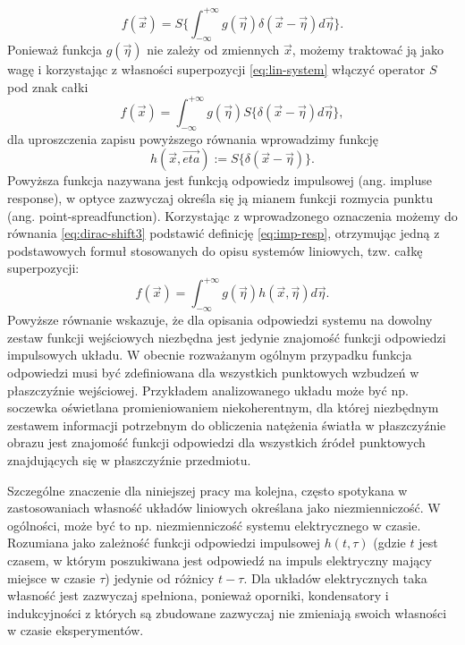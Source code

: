 \begin{equation}
f(\vec{x})=S \{\int_{-\infty}^{+\infty} g(\vec{\eta}) \delta(\vec{x}-\vec{\eta}) d \vec{\eta} \}.
\label{eq:dirac-shift2}
\end{equation}
Ponieważ funkcja $g(\vec{\eta})$ nie zależy od zmiennych $\vec{x}$, możemy traktować ją jako wagę i korzystając z własności superpozycji \ref{eq:lin-system} włączyć operator $S{}$ pod znak całki
\begin{equation}
f(\vec{x})=\int_{-\infty}^{+\infty} g(\vec{\eta})  S\{\delta(\vec{x}-\vec{\eta}) d \vec{\eta} \},
\label{eq:dirac-shift3}
\end{equation}
dla uproszczenia zapisu powyższego równania wprowadzimy funkcję
\begin{equation}
h(\vec{x},\vec{eta}):=S\{\delta(\vec{x}-\vec{\eta})\}.
\label{eq:imp-resp}
\end{equation}
Powyższa funkcja nazywana jest funkcją odpowiedz impulsowej (ang. impluse response), w optyce zazwyczaj określa się ją mianem funkcji rozmycia punktu (ang. point-spreadfunction). Korzystając z wprowadzonego oznaczenia możemy do równania \ref{eq:dirac-shift3}  podstawić definicję \ref{eq:imp-resp}, otrzymując jedną z podstawowych formuł stosowanych do opisu systemów liniowych, tzw. całkę superpozycji:
\begin{equation}
f(\vec{x})=\int_{-\infty}^{+\infty} g(\vec{\eta})  h(\vec{x},\vec{\eta}) d \vec{\eta} .
\label{eq:sup-int}
\end{equation}
Powyższe równanie wskazuje, że dla opisania odpowiedzi systemu na dowolny zestaw funkcji wejściowych niezbędna jest jedynie znajomość funkcji odpowiedzi impulsowych układu. W obecnie rozważanym ogólnym przypadku funkcja odpowiedzi musi być zdefiniowana dla wszystkich punktowych wzbudzeń w płaszczyźnie wejściowej. Przykładem analizowanego układu może być np. soczewka oświetlana promieniowaniem niekoherentnym, dla której niezbędnym zestawem informacji potrzebnym do obliczenia natężenia światła w płaszczyźnie obrazu jest znajomość funkcji odpowiedzi dla wszystkich źródeł punktowych znajdujących się w płaszczyźnie przedmiotu. 

Szczególne znaczenie dla niniejszej pracy ma kolejna, często spotykana w zastosowaniach własność układów liniowych określana jako niezmienniczość. W ogólności, może być to np. niezmienniczość systemu elektrycznego w czasie. Rozumiana jako zależność funkcji odpowiedzi impulsowej $h(t,\tau)$ (gdzie $t$ jest czasem, w którym poszukiwana jest odpowiedź na impuls elektryczny mający miejsce w czasie $\tau$) jedynie od różnicy $t-\tau$. Dla układów elektrycznych taka własność jest zazwyczaj spełniona, ponieważ oporniki, kondensatory i indukcyjności z których są zbudowane zazwyczaj nie zmieniają swoich własności w czasie eksperymentów.

